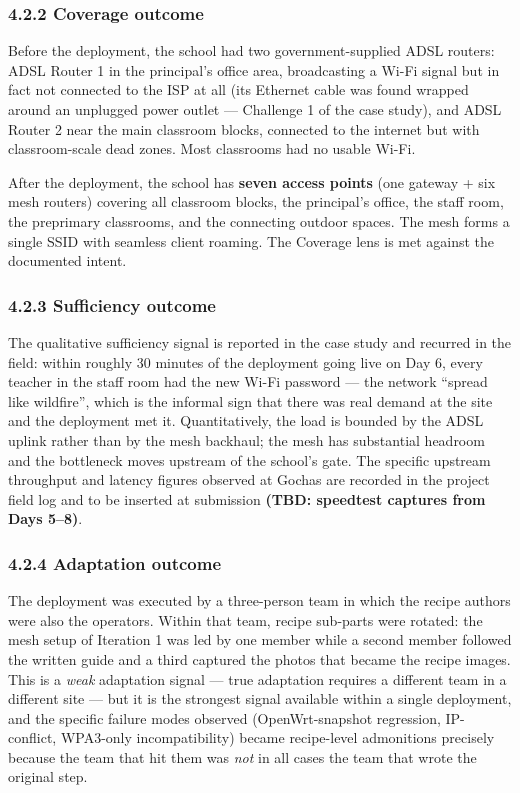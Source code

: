 \hypertarget{coverage-outcome}{%
\subsubsection{4.2.2 Coverage outcome}\label{coverage-outcome}}

Before the deployment, the school had two government-supplied ADSL
routers: ADSL Router 1 in the principal's office area, broadcasting a
Wi-Fi signal but in fact not connected to the ISP at all (its Ethernet
cable was found wrapped around an unplugged power outlet --- Challenge 1
of the case study), and ADSL Router 2 near the main classroom blocks,
connected to the internet but with classroom-scale dead zones. Most
classrooms had no usable Wi-Fi.

After the deployment, the school has \textbf{seven access points} (one
gateway + six mesh routers) covering all classroom blocks, the
principal's office, the staff room, the preprimary classrooms, and the
connecting outdoor spaces. The mesh forms a single SSID with seamless
client roaming. The Coverage lens is met against the documented intent.

\hypertarget{sufficiency-outcome}{%
\subsubsection{4.2.3 Sufficiency outcome}\label{sufficiency-outcome}}

The qualitative sufficiency signal is reported in the case study and
recurred in the field: within roughly 30 minutes of the deployment going
live on Day 6, every teacher in the staff room had the new Wi-Fi
password --- the network ``spread like wildfire'', which is the informal
sign that there was real demand at the site and the deployment met it.
Quantitatively, the load is bounded by the ADSL uplink rather than by
the mesh backhaul; the mesh has substantial headroom and the bottleneck
moves upstream of the school's gate. The specific upstream throughput
and latency figures observed at Gochas are recorded in the project field
log and to be inserted at submission \textbf{(TBD: speedtest captures
from Days 5--8)}.

\hypertarget{adaptation-outcome}{%
\subsubsection{4.2.4 Adaptation outcome}\label{adaptation-outcome}}

The deployment was executed by a three-person team in which the recipe
authors were also the operators. Within that team, recipe sub-parts were
rotated: the mesh setup of Iteration 1 was led by one member while a
second member followed the written guide and a third captured the photos
that became the recipe images. This is a \emph{weak} adaptation signal
--- true adaptation requires a different team in a different site ---
but it is the strongest signal available within a single deployment, and
the specific failure modes observed (OpenWrt-snapshot regression,
IP-conflict, WPA3-only incompatibility) became recipe-level admonitions
precisely because the team that hit them was \emph{not} in all cases the
team that wrote the original step.


